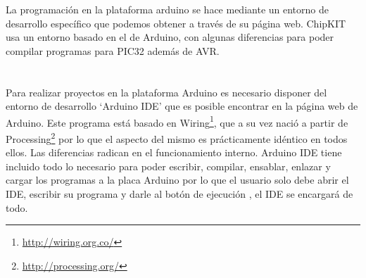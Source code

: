 La programación en la plataforma arduino se hace mediante un entorno de desarrollo específico que podemos obtener a través de su página web. ChipKIT usa un entorno basado en el de Arduino, con algunas diferencias para poder compilar programas para PIC32 además de AVR.

\section{}
Para realizar proyectos en la plataforma Arduino es necesario disponer del entorno de desarrollo `Arduino IDE' que es posible encontrar en la página web de Arduino. Este programa está basado en Wiring\footnote{\url{http://wiring.org.co/}}, que a su vez nació a partir de Processing\footnote{\url{http://processing.org/}} por lo que el aspecto del mismo es prácticamente idéntico en todos ellos. Las diferencias radican en el funcionamiento interno. Arduino IDE tiene incluido todo lo necesario para poder escribir, compilar, ensablar, enlazar y cargar los programas a la placa Arduino por lo que el usuario solo debe abrir el IDE, escribir su programa y darle al botón de ejecución , el IDE se encargará de todo.


